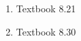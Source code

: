 \documentclass[11pt]{article}
\begin{document}
\begin{enumerate}
%
%
%
%
%
%
%
%
%
%
%


\vspace{5mm}
\item Textbook 8.21 %

\vspace{5mm}
\item Textbook 8.30 %


\end{enumerate}
\end{document}
